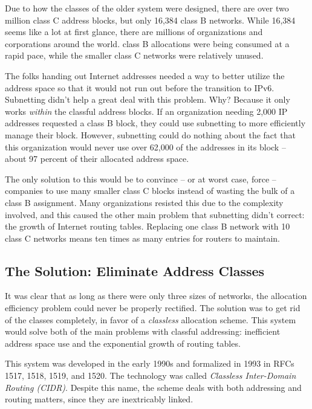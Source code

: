\documentclass[b5paper,11pt]{memoir}
\begin{document}
Due to how the classes of the older system were designed, there are over
two million class C address blocks, but only 16,384 class B networks.
While 16,384 seems like a lot at first glance, there are millions of
organizations and corporations around the world. class B allocations
were being consumed at a rapid pace, while the smaller class C networks
were relatively unused.

The folks handing out Internet addresses needed a way to better utilize
the address space so that it would not run out before the transition to
IPv6. Subnetting didn't help a great deal with this problem. Why?
Because it only works {\emph{within}} the classful address blocks. If an
organization needing 2,000 IP addresses requested a class B block, they
could use subnetting to more efficiently manage their block. However,
subnetting could do nothing about the fact that this organization would
never use over 62,000 of the addresses in its block -- about 97 percent
of their allocated address space.

The only solution to this would be to convince -- or at worst case,
force -- companies to use many smaller class C blocks instead of wasting
the bulk of a class B assignment. Many organizations resisted this due
to the complexity involved, and this caused the other main problem that
subnetting didn't correct: the growth of Internet routing tables.
Replacing one class B network with 10 class C networks means ten times
as many entries for routers to maintain.

\subsection[The Solution: Eliminate Address
Classes]{\texorpdfstring{\protect\hypertarget{ch20.htmlux5cux23the_solution_eliminate_address_classes}{}{}The
Solution: Eliminate Address
Classes}{The Solution: Eliminate Address Classes}}

It was clear that as long as there were only three sizes of networks,
the allocation efficiency problem could never be properly rectified. The
solution was to get rid of the classes completely, in favor of a
\protect\hypertarget{ch20.htmlux5cux23idx-CHP-20-0760}{}{}{\emph{classless}}
allocation scheme. This system would solve both of the main problems
with classful addressing: inefficient address space use and the
exponential growth of routing tables.

This system was developed in the early 1990s and formalized in 1993 in
RFCs 1517, 1518, 1519, and 1520. The technology was called
{\emph{Classless Inter-Domain Routing (CIDR)}}. Despite this name, the
scheme deals with both addressing and routing matters, since they are
inextricably linked.
\end{document}

